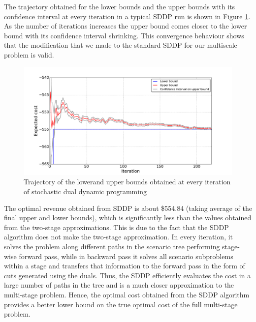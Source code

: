 \documentclass[11pt,twoside]{article}
\begin{document}
The trajectory obtained for the lower bounds and the upper bounds with its confidence interval at every iteration in a typical SDDP run is shown in Figure \ref{fig:bounds}. As the number of iterations increases the upper bound comes closer to the lower bound with its confidence interval shrinking. This convergence behaviour shows that the modification that we made to the standard SDDP for our multiscale problem is valid. 
\begin{figure}[h!]
\begin{center}
\includegraphics[scale=0.4]
{Figures/Plots/dualdynamic/bounds.pdf} \caption{Trajectory of the lowerand upper bounds obtained at every iteration of stochastic dual dynamic programming}\label{fig:bounds}
\end{center}
\end{figure}
\FloatBarrier
The optimal revenue obtained from SDDP is about \$554.84 (taking average of the final upper and lower bounds), which is significantly less than the values obtained from the two-stage approximations. This is due to the fact that the SDDP algorithm does not make the two-stage approximation. In every iteration, it solves the problem along different paths in the scenario tree performing stage-wise forward pass, while in backward pass it solves all scenario subproblems within a stage and transfers that information to the forward pass in the form of cuts generated using the duals. Thus, the SDDP efficiently evaluates the cost in a large number of paths in the tree and is a much closer approximation to the multi-stage problem. Hence, the optimal cost obtained from the SDDP algorithm provides a better lower bound on the true optimal cost of the full multi-stage problem.

\FloatBarrier
\end{document}
